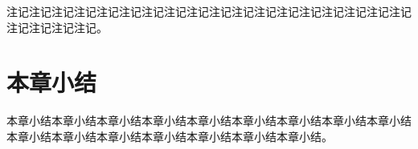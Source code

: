 \begin{remark}
注记注记注记注记注记注记注记注记注记注记注记注记注记注记注记注记注记注记注记注记注记注记。
\end{remark}



\section{本章小结}
\label{sec:3_Conclusion}

本章小结本章小结本章小结本章小结本章小结本章小结本章小结本章小结本章小结本章小结本章小结本章小结本章小结本章小结本章小结本章小结。



